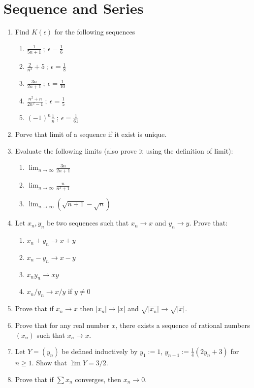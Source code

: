 \documentclass[12pt]{article}
\begin{document}
\newpage

\section{Sequence and Series}

\begin{enumerate}
     \item Find $K(\epsilon ) $ for the following sequences 
    \begin{enumerate}
        \item $\frac{1}{5n+1} ~;~ \epsilon = \frac{1}{6} $
        \item $\frac{2}{n^3}+5 ~; ~\epsilon = \frac{1}{8}$
        \item $\frac{3n}{2n+1} ~; ~\epsilon = \frac{1}{10}$
        \item$\frac{n^2 + n }{2n^2 -1} ~; ~\epsilon = \frac{1}{5}$
        \item$(-1)^n \frac{1 }{n} ~; ~\epsilon = \frac{1}{61}$
    \end{enumerate}

    \item Porve that limit of a sequence if it exist is unique.
    \item Evaluate the following limits (also prove it using the definition of limit):
    \begin{enumerate}
        \item \( \lim_{n \to \infty} \frac{3n}{2n+1} \)
        \item \( \lim_{n \to \infty} \frac{n}{n^2 + 1} \)
        \item \( \lim_{n \to \infty} (\sqrt{n+1} - \sqrt n) \)
    \end{enumerate}
    \item Let $x_n,y_n$ be two sequences such that $x_n \to x$ and $y_n \to y$. Prove that:
    \begin{enumerate}
        \item \( x_n + y_n \to x + y \)
        \item \( x_n - y_n \to x - y \)
        \item \( x_n y_n \to xy \)
        \item \( x_n / y_n \to x/y \) if \( y \neq 0 \)
    \end{enumerate}
    \item Prove that if $x_n\to x$ then $|x_n|\to|x|$ and $\sqrt{|x_n|}\to\sqrt{|x|}$.
    \item Prove that for any real number $x$, there exists a sequence of rational numbers $(x_n)$ such that $x_n \to x$.
    \item Let $Y = (y_n)$ be defined inductively by $y_1 := 1$, $y_{n+1} := \frac{1}{4}(2y_n+3)$ for $n \ge 1$. Show that $\lim Y = 3/2$.
    \item Prove that if $\sum x_n$ converges, then $x_n \to 0$.
\end{enumerate}
\end{document}
